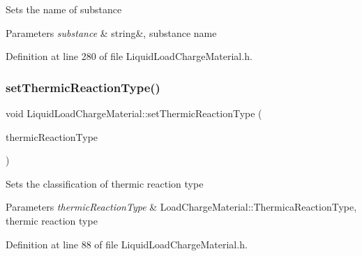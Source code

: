 Sets the name of substance 
\begin{DoxyParams}{Parameters}
{\em substance} & string\&, substance name \\
\hline
\end{DoxyParams}


Definition at line 280 of file Liquid\+Load\+Charge\+Material.\+h.

\mbox{\label{class_liquid_load_charge_material_a39c258d0bfdcfa352590d411a8c4e882}} 
\subsubsection{\texorpdfstring{set\+Thermic\+Reaction\+Type()}{setThermicReactionType()}\hspace{0.1cm}{\footnotesize\ttfamily [1/3]}}
{\footnotesize\ttfamily void Liquid\+Load\+Charge\+Material\+::set\+Thermic\+Reaction\+Type (\begin{DoxyParamCaption}\item[{\hyperlink{class_load_charge_material_a51d4263e865a5d86236622dd3fe23fd1}{Load\+Charge\+Material\+::\+Thermic\+Reaction\+Type}}]{thermic\+Reaction\+Type }\end{DoxyParamCaption})\hspace{0.3cm}{\ttfamily [inline]}}

Sets the classification of thermic reaction type 
\begin{DoxyParams}{Parameters}
{\em thermic\+Reaction\+Type} & Load\+Charge\+Material\+::\+Thermica\+Reaction\+Type, thermic reaction type \\
\hline
\end{DoxyParams}


Definition at line 88 of file Liquid\+Load\+Charge\+Material.\+h.

\mbox{\label{class_liquid_load_charge_material_a39c258d0bfdcfa352590d411a8c4e882}} 
